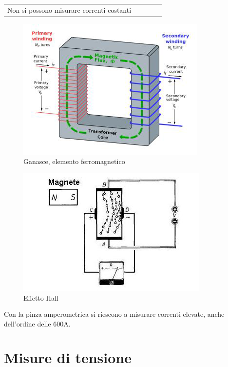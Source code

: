 \documentclass[a4paper, 15pt]{article}
\begin{document}
\begin{adjustwidth}{2in}{}
\begin{flushright}
\begin{table}[H]
\begin{tabular}{|l|l|lll}
				Non si possono misurare correnti costanti                                                                                                                                                         &                                                                                                                                                                                                                                                                                                                &  &  &  \\ \cline{1-2}
			\end{tabular}
		\end{table}
\end{flushright}
\end{adjustwidth}
\begin{figure}[H]
	\centering
	\includegraphics[width=0.3\linewidth]{fig/screenshot005}
	\caption{Ganasce, elemento ferromagnetico}
	\label{fig:screenshot005}
\end{figure}
\begin{figure}[H]
	\centering
	\includegraphics[width=0.3\linewidth]{fig/screenshot006}
	\caption{Effetto Hall}
	\label{fig:screenshot006}
\end{figure}
		Con la pinza amperometrica si riescono a misurare correnti elevate, anche dell'ordine delle 600A.  
\newpage		
\section{Misure di tensione}
\end{document}
